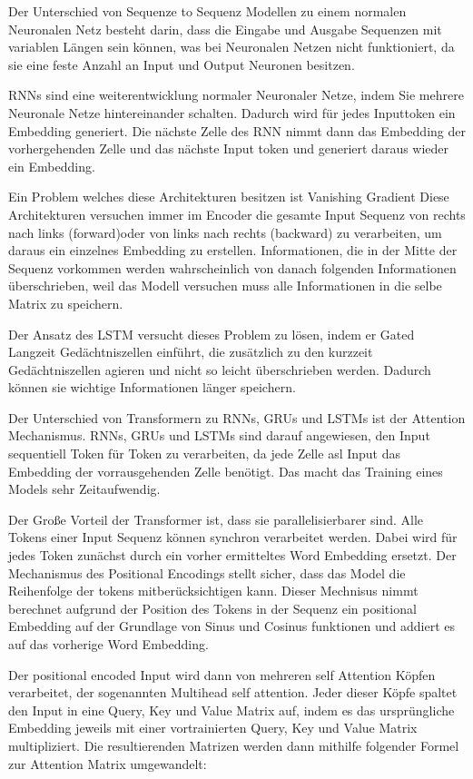 Der Unterschied von Sequenze to Sequenz Modellen zu einem normalen Neuronalen Netz besteht darin, dass die Eingabe und Ausgabe Sequenzen mit variablen Längen sein können, was bei Neuronalen Netzen nicht funktioniert, da sie eine feste Anzahl an Input und Output Neuronen besitzen.

RNNs sind eine weiterentwicklung normaler Neuronaler Netze, indem Sie mehrere Neuronale Netze hintereinander schalten. 
Dadurch wird für jedes Inputtoken ein Embedding generiert. 
Die nächste Zelle des RNN nimmt dann das Embedding der vorhergehenden Zelle und das nächste Input token und generiert daraus wieder ein Embedding.

Ein Problem welches diese Architekturen besitzen ist Vanishing Gradient
Diese Architekturen versuchen immer im Encoder die gesamte Input Sequenz von rechts nach links (forward)oder von links nach rechts (backward) zu verarbeiten, um daraus ein einzelnes Embedding zu erstellen.
Informationen, die in der Mitte der Sequenz vorkommen werden wahrscheinlich von danach folgenden Informationen überschrieben, weil das Modell versuchen muss alle Informationen in die selbe Matrix zu speichern. 

Der Ansatz des LSTM versucht dieses Problem zu lösen, indem er Gated Langzeit Gedächtniszellen einführt, die zusätzlich zu den kurzzeit Gedächtniszellen agieren und nicht so leicht überschrieben werden.
Dadurch können sie wichtige Informationen länger speichern.

Der Unterschied von Transformern zu RNNs, GRUs und LSTMs ist der Attention Mechanismus.
RNNs, GRUs und LSTMs sind darauf angewiesen, den Input sequentiell Token für Token zu verarbeiten, da jede Zelle asl Input das Embedding der vorrausgehenden Zelle benötigt.
Das macht das Training eines Models sehr Zeitaufwendig.

Der Große Vorteil der Transformer ist, dass sie parallelisierbarer sind.
Alle Tokens einer Input Sequenz können synchron verarbeitet werden. 
Dabei wird für jedes Token zunächst durch ein vorher ermitteltes Word Embedding ersetzt.
Der Mechanismus des Positional Encodings stellt sicher, dass das Model die Reihenfolge der tokens mitberücksichtigen kann.
Dieser Mechnisus nimmt berechnet aufgrund der Position des Tokens in der Sequenz ein positional Embedding auf der Grundlage von Sinus und Cosinus funktionen und addiert es auf das vorherige Word Embedding.

Der positional encoded Input wird dann von mehreren self Attention Köpfen verarbeitet, der sogenannten Multihead self attention. 
Jeder dieser Köpfe spaltet den Input in eine Query, Key und Value Matrix auf, indem es das ursprüngliche Embedding jeweils mit einer vortrainierten Query, Key und Value Matrix multipliziert.
Die resultierenden Matrizen werden dann mithilfe folgender Formel zur Attention Matrix umgewandelt:

